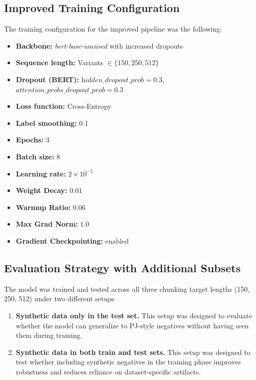 \subsection{Improved Training Configuration}

The training configuration for the improved pipeline was the following:

\begin{itemize}
  \item \textbf{Backbone:} \textit{bert-base-uncased} with increased dropouts
  \item \textbf{Sequence length:} Variants \(\in \{150, 250, 512\}\) 
  \item \textbf{Dropout (BERT):} \(\textit{hidden\_dropout\_prob}=0.3\), \(\textit{attention\_probs\_dropout\_prob}=0.3\)
  \item \textbf{Loss function:} Cross-Entropy 
  \item \textbf{Label smoothing:} \(0.1\) 
  \item \textbf{Epochs:} \(3\)
  \item \textbf{Batch size:} \(8\)
  \item \textbf{Learning rate:} \(2\times10^{-5}\)
  \item \textbf{Weight Decay:} \(0.01\)
  \item \textbf{Warmup Ratio:} \(0.06\)
  \item \textbf{Max Grad Norm:} \(1.0\)
  \item \textbf{Gradient Checkpointing:} enabled 
\end{itemize}


\subsection{Evaluation Strategy with Additional Subsets}

The model was trained and tested across all three chunking target lengths (150, 250, 512) under two different setups
\begin{enumerate}
\item \textbf{Synthetic data only in the test set.}
This setup was designed to evaluate whether the model can generalize to PJ-style negatives without having seen them during training.
\item \textbf{Synthetic data in both train and test sets.}
This setup was designed to test whether including synthetic negatives in the training phase improves robustness and reduces reliance on dataset-specific artifacts.
\end{enumerate}

